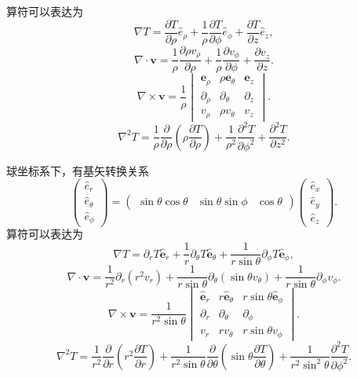 \documentclass[UTF8]{ctexbook}
\renewcommand{\b}{\boldsymbol}
\numberwithin{equation}{chapter}
\begin{document}
	算符可以表达为
	\[\nabla T=\frac{\partial T}{\partial \rho}\hat{e}_\rho+\frac{1}{\rho}\frac{\partial T}{\partial \phi}\hat{e}_\phi+\frac{\partial T}{\partial z}\hat{e}_z,\]
	\[\nabla\cdot\b{v}=\frac{1}{\rho}\frac{\partial \rho v_\rho}{\partial \rho}+\frac{1}{\rho}\frac{\partial v_\phi}{\partial \phi}+\frac{\partial v_z}{\partial z}.\]
	\[\nabla\times\b{v}=\frac{1}{\rho}\begin{vmatrix} \b{e}_\rho & \rho\b{e}_\theta & \b{e}_z \\ \partial_\rho & \partial_\theta & \partial_z \\ v_\rho & \rho v_\theta & v_z\end{vmatrix}.\]
	\[\nabla^2 T=\frac{1}{\rho}\frac{\partial }{\partial \rho}\left(\rho\frac{\partial T}{\partial \rho}\right)+\frac{1}{\rho^2}\frac{\partial^2 T}{\partial \phi^2}+\frac{\partial^2 T}{\partial z^2}.\]
	
	球坐标系下，有基矢转换关系
	\[\begin{pmatrix} \hat{e}_r \\ \hat{e}_\theta \\ \hat{e}_\phi\end{pmatrix} = \begin{pmatrix} \sin\theta\cos\theta & \sin\theta\sin\phi & \cos\theta  \end{pmatrix}\begin{pmatrix} \hat{e}_x \\ \hat{e}_y \\ \hat{e}_z\end{pmatrix}.\]
	算符可以表达为
	\[\nabla T=\partial_r T\hat{\b{e}}_r + \frac{1}{r}\partial_\theta T\hat{\b{e}}_\theta+\frac{1}{r\sin\theta}\partial_\phi T\hat{\b{e}}_\phi,\]
	\[\nabla\cdot\b{v}=\frac{1}{r^2}\partial_r(r^2 v_r)+\frac{1}{r\sin\theta}\partial_\theta(\sin\theta v_\theta)+\frac{1}{r\sin\theta}\partial_\phi v_\phi.\]
	\[\nabla\times\b{v}=\frac{1}{r^2\sin\theta}\begin{vmatrix} \hat{\b{e}}_r & r\hat{\b{e}}_\theta & r\sin\theta\hat{\b{e}}_\phi \\ \partial_r & \partial_\theta & \partial_\phi \\ v_r & rv_\theta & r\sin\theta v_\phi\end{vmatrix}.\]
	\[\nabla^2 T=\frac{1}{r^2}\frac{\partial }{\partial r}\left(r^2\frac{\partial T}{\partial r}\right)+\frac{1}{r^2\sin\theta}\frac{\partial }{\partial \theta}\left(\sin\theta\frac{\partial T}{\partial \theta}\right)+\frac{1}{r^2\sin^2\theta}\frac{\partial^2 T}{\partial \phi^2}.\]
	
\end{document}
